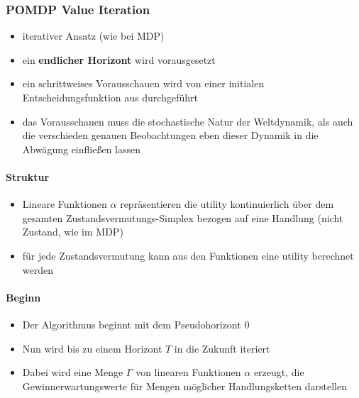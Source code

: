 \subsubsection{POMDP Value Iteration}
\begin{itemize}
	\item iterativer Ansatz (wie bei MDP)
	\item ein \textbf{endlicher Horizont} wird vorausgesetzt
	\item ein schrittweises Vorausschauen wird von einer initialen Entscheidungsfunktion aus durchgef\"uhrt
	\item das Vorausschauen muss die stochastische Natur der Weltdynamik, als auch die verschieden genauen Beobachtungen eben dieser Dynamik in die Abw\"agung einflie{\ss}en lassen
\end{itemize}

\paragraph{Struktur}
\begin{itemize}
	\item Lineare Funktionen $\alpha$ repr\"asentieren die utility kontinuierlich \"uber dem gesamten Zustandsvermutungs-Simplex bezogen auf eine Handlung (nicht Zustand, wie im MDP)
	\item f\"ur jede Zustandsvermutung kann aus den Funktionen eine utility berechnet werden
\end{itemize}

\paragraph{Beginn}
\begin{itemize}
	\item Der Algorithmus beginnt mit dem Pseudohorizont $0$
	\item Nun wird bis zu einem Horizont $T$ in die Zukunft iteriert
	\item Dabei wird eine Menge $\Gamma$ von linearen Funktionen $\alpha$ erzeugt, die Gewinnerwartungswerte f\"ur Mengen m\"oglicher Handlungsketten darstellen
\end{itemize}

